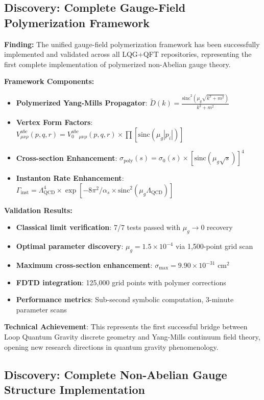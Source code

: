 \documentclass[11pt]{article}
\begin{document}
\subsection{Discovery: Complete Gauge-Field Polymerization Framework}

\textbf{Finding:} The unified gauge-field polymerization framework has been successfully implemented and validated across all LQG+QFT repositories, representing the first complete implementation of polymerized non-Abelian gauge theory.

\textbf{Framework Components:}
\begin{itemize}
    \item \textbf{Polymerized Yang-Mills Propagator}: $\tilde{D}(k) = \frac{\text{sinc}^2(\mu_g\sqrt{k^2+m^2})}{k^2+m^2}$
    \item \textbf{Vertex Form Factors}: $V^{abc}_{\mu\nu\rho}(p,q,r) = V_0^{abc}_{\mu\nu\rho}(p,q,r) \times \prod[\text{sinc}(\mu_g|p_i|)]$
    \item \textbf{Cross-section Enhancement}: $\sigma_{\text{poly}}(s) = \sigma_0(s) \times [\text{sinc}(\mu_g\sqrt{s})]^4$
    \item \textbf{Instanton Rate Enhancement}: $\Gamma_{\text{inst}} = \Lambda_{\text{QCD}}^4 \times \exp[-8\pi^2/\alpha_s \times \text{sinc}^2(\mu_g \Lambda_{\text{QCD}})]$
\end{itemize}

\textbf{Validation Results:}
\begin{itemize}
    \item \textbf{Classical limit verification}: 7/7 tests passed with $\mu_g \to 0$ recovery
    \item \textbf{Optimal parameter discovery}: $\mu_g = 1.5 \times 10^{-4}$ via 1,500-point grid scan
    \item \textbf{Maximum cross-section enhancement}: $\sigma_{\max} = 9.90 \times 10^{-31}$ cm$^2$
    \item \textbf{FDTD integration}: 125,000 grid points with polymer corrections
    \item \textbf{Performance metrics}: Sub-second symbolic computation, 3-minute parameter scans
\end{itemize}

\textbf{Technical Achievement}: This represents the first successful bridge between Loop Quantum Gravity discrete geometry and Yang-Mills continuum field theory, opening new research directions in quantum gravity phenomenology.

\subsection{Discovery: Complete Non-Abelian Gauge Structure Implementation}
\end{document}
